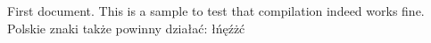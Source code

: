 \documentclass{article}
\begin{document}
First document. This is a sample to test that compilation indeed works fine.
Polskie znaki także powinny działać: łńęźżć
\end{document}
